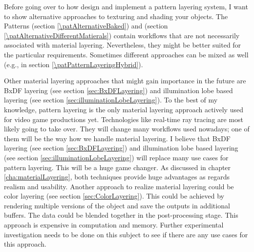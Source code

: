 Before going over to how design and implement a pattern layering system, I want to show alternative approaches to texturing and shading your objects. The Patterns \emph{\patAlternativeBaked} (section \ref{\patAlternativeBaked}) and \emph{\patAlternativeDifferentMatierals} (section \ref{\patAlternativeDifferentMatierals}) %
contain workflows that are not necessarily associated with material layering. Nevertheless, they might be better suited for the particular requirements. Sometimes different approaches can be mixed as well (e.g., \emph{\patPatternLayeringHybrid} in section \ref{\patPatternLayeringHybrid}).

Other material layering approaches that might gain importance in the future are BxDF layering (see section \ref{sec:BxDFLayering}) and illumination lobe based layering (see section \ref{sec:illuminationLobeLayering}). To the best of my knowledge, pattern layering is the only material layering approach actively used for video game productions yet. Technologies like real-time ray tracing are most likely going to take over. They will change many workflows used nowadays; one of them will be the way how we handle material layering. I believe that BxDF layering (see section \ref{sec:BxDFLayering}) and illumination lobe based layering (see section \ref{sec:illuminationLobeLayering}) will replace many use cases for pattern layering. This will be a huge game changer. As discussed in chapter \ref{cha:materialLayering}, both techniques provide huge advantages as regards realism and usability. Another approach to realize material layering could be color layering (see section \ref{sec:ColorLayering}). This could be achieved by rendering multiple versions of the object and save the outputs in additional buffers. The data could be blended together in the post-processing stage. This approach is expensive in computation and memory. Further experimental investigation needs to be done on this subject to see if there are any use cases for this approach. 




